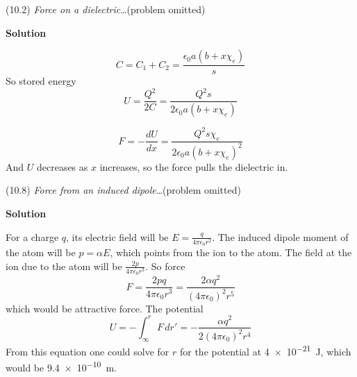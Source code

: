\documentclass{article}
\begin{document}
\maketitle
\newpage





\begin{homeworkProblem}
	(10.2) \textit{Force on a dielectric}\ldots (problem omitted)

	\textbf{Solution}
	\begin{enumerate}[label = (\alph*)]
		\begin{item}
			\[
				C=C_1+C_2=\frac{\epsilon_0a(b+x\chi_e)}{s}
			\]
			So stored energy
			\[
				U=\frac{Q^2}{2C}=\frac{Q^2s}{2\epsilon_0a(b+x\chi_e)}
			\]
		\end{item}
		\begin{item}
			\[
				F=-\frac{dU}{dx}=\frac{Q^2s\chi_e}{2\epsilon_0a{(b+x\chi_e)}^2}
			\]
			And $U$ decreases as $x$ increases, so the force pulls the dielectric in.
		\end{item}
	\end{enumerate}
\end{homeworkProblem}


\begin{homeworkProblem}
	(10.8) \textit{Force from an induced dipole}\ldots (problem omitted)

	\textbf{Solution}

	For a charge $q$, its electric field will be $E=\frac{q}{4\pi\epsilon_0r^2}$. The induced dipole moment of the atom will be $p=\alpha E$, which points from the ion to the atom. The field at the ion due to the atom will be $\frac{2p}{4\pi\epsilon_0r^3}$. So force
	\[
		F=\frac{2pq}{4\pi\epsilon_0r^3}=\frac{2\alpha q^2}{{(4\pi\epsilon_0)}^2r^5}
	\]
	which would be attractive force. The potential
	\[
		U=-\int_\infty^r F\,dr'=-\frac{\alpha q^2}{2{(4\pi\epsilon_0)}^2r^4}
	\]
	From this equation one could solve for $r$ for the potential at \SI{4e-21}{\joule}, which would be \SI{9.4e-10}{\m}.
\end{homeworkProblem}
\end{document}
